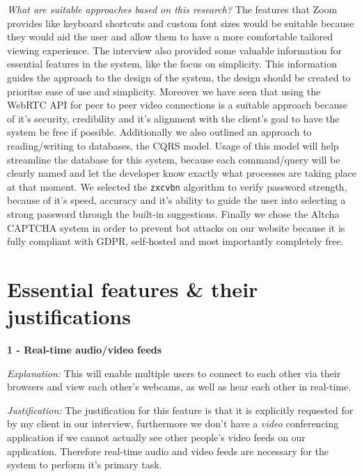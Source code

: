 \textit{What are suitable approaches based on this research?}
The features that Zoom provides like keyboard shortcuts and 
custom font sizes would be suitable because they would aid the
user and allow them to have a more comfortable tailored 
viewing experience. The interview also provided some valuable 
information for essential features in the system, like the 
focus on simplicity. This information guides the approach to 
the design of the system, the design should be created to 
prioritse ease of use and simplicity. Moreover we have seen 
that using the WebRTC API for peer to peer video connections
is a suitable approach because of it's security, credibility
and it's alignment with the client's goal to have the system
be free if possible. Additionally we also outlined an 
approach to reading/writing to databases, the 
CQRS model. Usage of this model will help streamline the 
database for this system, because each command/query will be
clearly named and let the developer know exactly what 
processes are taking place at that moment. We selected
the \texttt{zxcvbn} algorithm to verify password strength, 
because of it's speed, accuracy and it's ability to guide the 
user into selecting a strong password through the built-in 
suggestions. Finally we chose the Altcha CAPTCHA system in 
order to prevent bot attacks on our website because it is 
fully compliant with GDPR, self-hosted and most importantly 
completely free.

\section{Essential features \& their justifications}
\label{sec:features}

\textsf{\bfseries 1 - Real-time audio/video feeds} \\ \vspace{0.1cm}

\textit{Explanation:} This will enable multiple users to 
connect to each other via their browsers and view each 
other's webcams, as well as hear
each other in real-time. \vspace{0.1cm}

\textit{Justification:} The justification for this feature is
that it is explicitly requested for by my client in our
interview, furthermore we don't have a \textit{video}
conferencing application if we cannot actually see other 
people's video feeds on our application. Therefore real-time
audio and video feeds are necessary for the system to perform
it's primary task.

